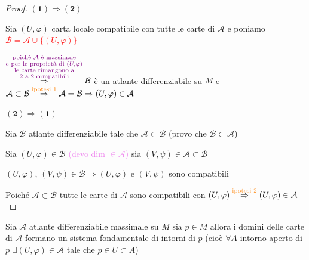         \begin{proof}
        \mbox{}

        $\mathbf{(1) \Rightarrow (2)}$ 

        Sia $(U, \varphi)$ carta locale compatibile con tutte le carte di $\mathcal{A}$ e poniamo \textcolor{red}{$\mathcal{B} = \mathcal{A} \cup \{(U, \varphi)\}$}
        
        $ \overset{\textcolor{violet}{\substack{\text{poiché } \mathcal{A} \text{ è massimale} \\
        \text{e per le proprietà di } (U, \varphi) \\ \text{le carte rimangono a} \\ 2 \text{ a } 2 \text{ compatibili}}}}{\Rightarrow} \mathcal{B}$ è un atlante differenziabile su $M$ e $\mathcal{A} \subset \mathcal{B} \overset{\textcolor{orange}{\text{ipotesi 1}}}{\Rightarrow} \mathcal{A} = \mathcal{B}
        \Rightarrow (U, \varphi) \in \mathcal{A}$

        $\mathbf{(2) \Rightarrow (1)}$ 

        Sia $\mathcal{B}$ atlante differenziabile tale che $\mathcal{A} \subset \mathcal{B}$  \textcolor{blu}{(provo che $\mathcal{B} \subset \mathcal{A}$)}
        
        Sia $(U, \varphi) \in \mathcal{B}$ \textcolor{violet}{(devo dim $\in \mathcal{A}$)} sia $(V, \psi) \in \mathcal{A} \subset \mathcal{B}$
        
        $(U, \varphi)$, $(V, \psi) \in \mathcal{B} \Rightarrow (U, \varphi)$ e $(V, \psi)$ sono compatibili

        Poiché $\mathcal{A} \subset \mathcal{B}$ tutte le carte di $\mathcal{A}$ sono compatibili con $(U, \varphi) \overset{\textcolor{orange}{\text{ipotesi 2}}}{\Rightarrow} (U, \varphi) \in \mathcal{A}$
        \end{proof}
        \newpage
        \begin{proposizione}
        \label{prop:atlante_differenziabile_massimale_domini_delle_carte_ammettono_un_sistema_fondamentale_di_intorni}
        \mbox{}

        Sia $\mathcal{A}$ atlante differenziabile massimale su $M$ sia $p \in M$ allora i domini delle carte di $\mathcal{A}$
        formano un sistema fondamentale di intorni di $p$ \textcolor{blu}{(cioè $\forall A$ intorno aperto di $p$}
        \textcolor{blu}{$\exists (U, \varphi) \in \mathcal{A}$ tale che $p \in U \subset A$)}

        \end{proposizione}
